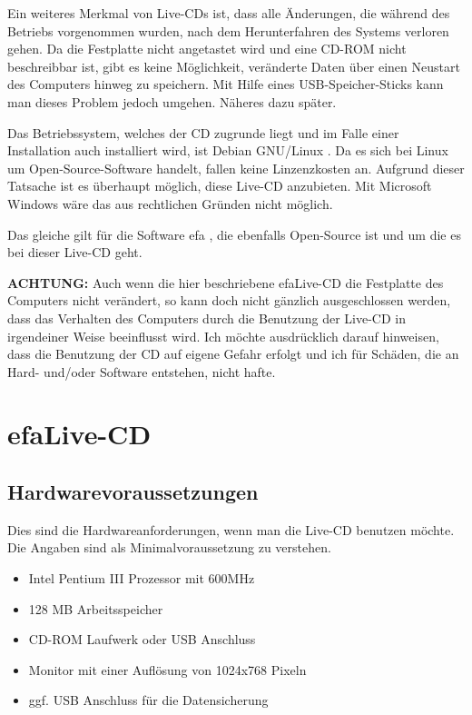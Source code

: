\documentclass[a4paper,12pt,twoside]{article}
\begin{document}
Ein weiteres Merkmal von Live-CDs ist, dass alle Änderungen, die während
des Betriebs vorgenommen wurden, nach dem Herunterfahren des Systems
verloren gehen. Da die Festplatte nicht angetastet wird und eine CD-ROM
nicht beschreibbar ist, gibt es keine Möglichkeit, veränderte Daten
über einen Neustart des Computers hinweg zu speichern. Mit Hilfe eines
USB-Speicher-Sticks kann man dieses Problem jedoch umgehen. Näheres
dazu später.

Das Betriebssystem, welches der CD zugrunde liegt und im Falle einer
Installation auch installiert wird, ist Debian GNU/Linux \cite{DEB1}.
Da es sich bei Linux um Open-Source-Software handelt, fallen keine
Linzenzkosten an. Aufgrund dieser Tatsache ist es überhaupt möglich,
diese Live-CD anzubieten. Mit Microsoft Windows wäre das aus
rechtlichen Gründen nicht möglich.

Das gleiche gilt für die Software efa \cite{EFA1}, die ebenfalls
Open-Source ist und um die es bei dieser Live-CD geht.

\bigskip
\textbf{ACHTUNG:} Auch wenn die hier beschriebene efaLive-CD die Festplatte des
Computers nicht verändert, so kann doch nicht gänzlich ausgeschlossen
werden, dass das Verhalten des Computers durch die Benutzung der
Live-CD in irgendeiner Weise beeinflusst wird. Ich möchte ausdrücklich
darauf hinweisen, dass die Benutzung der CD auf eigene Gefahr erfolgt
und ich für Schäden, die an Hard- und/oder Software entstehen, nicht
hafte.
\bigskip

\section{efaLive-CD}
\label{sct:efalivecd}
\subsection{Hardwarevoraussetzungen}
\label{sct:live_hardware}
Dies sind die Hardwareanforderungen, wenn man die Live-CD benutzen
möchte. Die Angaben sind als Minimalvoraussetzung zu verstehen.

\begin{itemize}
    \item Intel Pentium III Prozessor mit 600MHz
    \item 128 MB Arbeitsspeicher
    \item CD-ROM Laufwerk oder USB Anschluss
    \item Monitor mit einer Auflösung von 1024x768 Pixeln
    \item ggf. USB Anschluss für die Datensicherung
\end{itemize}
\end{document}
